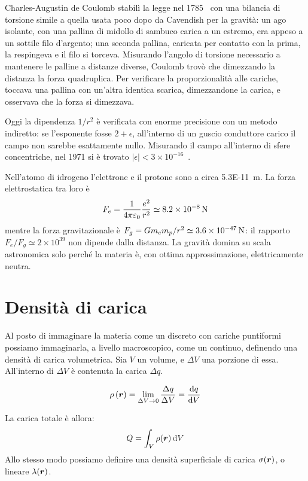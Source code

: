 \begin{Es}
  Charles-Augustin de Coulomb stabilì la legge nel 1785~\cite{coulomb1785} con una bilancia di torsione simile a quella usata poco dopo da Cavendish per la gravità: un ago isolante, con una pallina di midollo di sambuco carica a un estremo, era appeso a un sottile filo d'argento; una seconda pallina, caricata per contatto con la prima, la respingeva e il filo si torceva. Misurando l'angolo di torsione necessario a mantenere le palline a distanze diverse, Coulomb trovò che dimezzando la distanza la forza quadruplica. Per verificare la proporzionalità alle cariche, toccava una pallina con un'altra identica scarica, dimezzandone la carica, e osservava che la forza si dimezzava.

  Oggi la dipendenza $1/r^2$ è verificata con enorme precisione con un metodo indiretto: se l'esponente fosse $2+\epsilon$, all'interno di un guscio conduttore carico il campo non sarebbe esattamente nullo. Misurando il campo all'interno di sfere concentriche, nel 1971 si è trovato $|\epsilon|<3\times10^{-16}$~\cite{williams1971}.
\end{Es}
\begin{Es}
  Nell'atomo di idrogeno l'elettrone e il protone sono a circa \SI{5.3E-11}{\meter}. La forza elettrostatica tra loro è
  \[
    F_e=\frac{1}{4\pi\varepsilon_0}\frac{e^2}{r^2}\simeq\SI{8.2E-8}{\newton}
  \]
  mentre la forza gravitazionale è $F_g=Gm_em_p/r^2\simeq\SI{3.6E-47}{\newton}$: il rapporto $F_e/F_g\simeq2\times10^{39}$ non dipende dalla distanza. La gravità domina su scala astronomica solo perché la materia è, con ottima approssimazione, elettricamente neutra.
\end{Es}

\section{Densità di carica}
Al posto di immaginare la materia come un discreto con cariche puntiformi possiamo immaginarla, a livello macroscopico, come un continuo, definendo una densità di carica volumetrica. Sia $V$ un volume, e $\Delta V$ una porzione di essa. All'interno di $\Delta V$ è contenuta la carica $\Delta q$.
\begin{Def}
  \[\rho\left({\boldsymbol{r}}\right)=\lim_{\Delta V\to 0}\frac{\Delta q}{\Delta V}=\frac{\mathrm{d} q}{\mathrm{d} V}\]
\end{Def}
La carica totale è allora:
\[Q=\int_V\rho(\boldsymbol{r})\,\mathrm{d} V\]
Allo stesso modo possiamo definire una densità superficiale di carica $\sigma(\boldsymbol{r})$, o lineare $\lambda(\boldsymbol{r})$.
